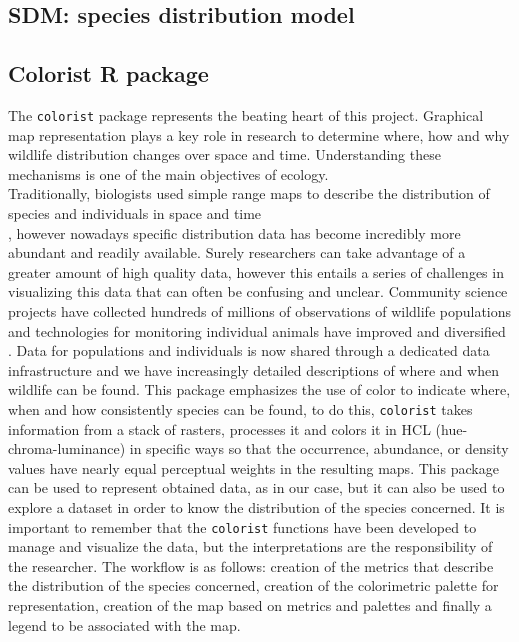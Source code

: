 \documentclass[12pt,a4paper]{article}
\begin{document}
\subsection{SDM: species distribution model} 
\subsection{Colorist R package}
The \texttt{colorist} package represents the beating heart of this project.
Graphical map representation plays a key role in research to determine where, how and why wildlife distribution changes over space and time.\citep{colo}
Understanding these mechanisms is one of the main objectives of ecology.\\\citep{and1}
Traditionally, biologists used simple range maps to describe the distribution of species and individuals in space and time \citep{brt} \\\citep{gri}, however nowadays specific distribution data has become incredibly more abundant and readily available.
Surely researchers can take advantage of a greater amount of high quality data, however this entails a series of challenges in visualizing this data that can often be confusing and unclear.\citep{colo}
Community science projects have collected hundreds of millions of observations of wildlife populations \citep{nat} \citep{sal} and technologies for monitoring individual animals have improved and diversified \citep{ks}. Data for populations and individuals is now shared through a dedicated data infrastructure \citep{gbif} \citep{kra} and we have increasingly detailed descriptions of where and when wildlife can be found.
This package emphasizes the use of color to indicate where, when and how consistently species can be found, to do this, \texttt{colorist} takes information from a stack of rasters, processes it and colors it in HCL (hue-chroma-luminance) in specific ways so that the occurrence, abundance, or density values have nearly equal perceptual weights in the resulting maps. \citep{colo}
This package can be used to represent obtained data, as in our case, but it can also be used to explore a dataset in order to know the distribution of the species concerned.
It is important to remember that the \texttt{colorist} functions have been developed to manage and visualize the data, but the interpretations are the responsibility of the researcher.\citep{colo}
The workflow is as follows: creation of the metrics that describe the distribution of the species concerned, creation of the colorimetric palette for representation, creation of the map based on metrics and palettes and finally a legend to be associated with the map.
\end{document}
